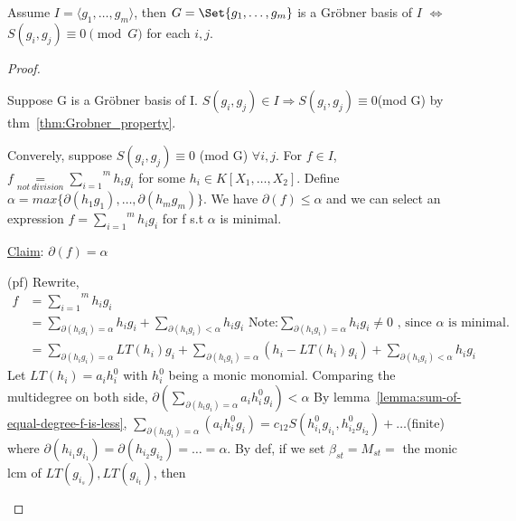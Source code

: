 \begin{theorem}
  Assume $I = \langle g_1, \dots, g_m \rangle$, then
  $G = \Set{g_1, \dots, g_m}$ is a Gr\"{o}bner basis of $I$ $\iff$ $S(g_i, g_j) \equiv 0 \pmod{G}$ for each $i, j$.
  \begin{proof}
    \begin{description} [leftmargin=0cm,labelindent=0cm]
      \item
      \item[$\cdot$] Suppose G is a Gr\"{o}bner basis of I. $S(g_i, g_j) \in I \Rightarrow S(g_i, g_j) \equiv 0$(mod G) by thm~\ref{thm:Grobner_property}.
      \item[$\cdot$] Converely, suppose $S(g_i, g_j) \equiv 0$ (mod G) $\forall i, j$. For $f \in I$, $f \underset{not\ division}{=} \overset{m}{\underset{i = 1}{\sum}}h_ig_i$ for some $h_i \in K[X_1,\dots,X_2]$. Define $\alpha = max\{\partial(h_1g_1),\dots,\partial(h_mg_m)\}$. We have $\partial(f) \leq \alpha$ and we can select an expression $f = \overset{m}{\underset{i = 1}{\sum}}h_ig_i$ for f s.t $\alpha$ is minimal.
      \item[] \uline{Claim}:   $\partial(f) = \alpha$
      \item (pf) Rewrite,
          \begin{equation}
            \begin{split}f &= \overset{m}{\underset{i = 1}{\sum}}h_ig_i \\
            &= \underset{\partial(h_ig_i) = \alpha}{\sum}h_ig_i +  \underset{\partial(h_ig_i) < \alpha}{\sum}h_ig_i \text{ \ \ Note:}  \underset{\partial(h_ig_i) = \alpha}{\sum}h_ig_i \neq 0 \text{ , since } \alpha \text{ is minimal.}\\
            &= \underset{\partial(h_ig_i) = \alpha}{\sum}LT(h_i)g_i + \underset{\partial(h_ig_i) = \alpha}{\sum}(h_i-LT(h_i)g_i) + \underset{\partial(h_ig_i) < \alpha}{\sum}{h_ig_i}
            \end{split}
          \end{equation}
          Let $LT(h_i) = a_ih_i^0$ with $h_i^0$ being a monic monomial. Comparing the multidegree on both side, $\partial\left(\underset{\partial(h_ig_i) = \alpha}{\sum}a_ih_i^0g_i\right) < \alpha$ By lemma~\ref{lemma:sum-of-equal-degree-f-is-less}, $\underset{\partial(h_ig_i) = \alpha}{\sum}\left(a_ih_i^0g_i\right) = c_{12}S(h_{i_1}^0g_{i_1},h_{i_2}^0g_{i_2}) + \dots$(finite) where $\partial(h_{i_1}g_{i_1}) = \partial(h_{i_2}g_{i_2}) = \dots = \alpha $. By def, if we set $\beta_{st} = M_{st} =$ the monic lcm of $LT(g_{i_s}), LT(g_{i_t})$, then

\end{description}
\end{proof}
\end{theorem}
